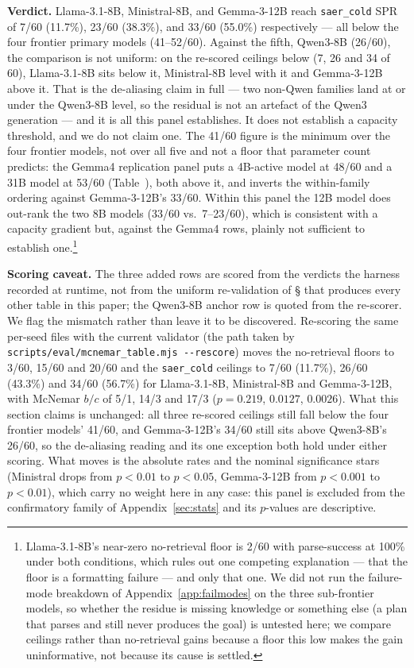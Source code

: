 \documentclass[letterpaper]{article} %
\newcommand{\appref}[1]{Appendix~\ref{#1}}
\newcommand{\bodyref}[1]{\getrefnumber{#1}}
\begin{document}
\textbf{Verdict.}  Llama-3.1-8B, Ministral-8B, and Gemma-3-12B reach
\texttt{saer\_cold} SPR of 7/60 (11.7\%), 23/60 (38.3\%), and 33/60
(55.0\%) respectively --- all below the four frontier primary models
(41--52/60).  Against the fifth, Qwen3-8B (26/60), the comparison is not
uniform: on the re-scored ceilings below (7, 26 and 34 of 60), Llama-3.1-8B
sits below it, Ministral-8B level with it and Gemma-3-12B above it.
That is the de-aliasing claim in full --- two non-Qwen families land at or
under the Qwen3-8B level, so the residual is not an artefact of the Qwen3
generation --- and it is all this panel establishes.  It does not establish a
capacity threshold, and we do not claim one.  The 41/60 figure is the minimum
over the four frontier models, not over all five and not a floor that
parameter count predicts: the Gemma4 replication panel puts a 4B-active model at 48/60
and a 31B model at 53/60 (Table~\bodyref{tab:main}), both above it, and
inverts the within-family ordering against Gemma-3-12B's 33/60.  Within
this panel the 12B model does out-rank the two 8B models
(33/60 vs.\ 7--23/60), which is consistent with a capacity gradient but,
against the Gemma4 rows, plainly not sufficient to establish
one.\footnote{Llama-3.1-8B's near-zero no-retrieval floor is 2/60 with
parse-success at 100\% under both conditions, which rules out one competing
explanation --- that the floor is a formatting failure --- and only that one.
We did not run the failure-mode breakdown of \appref{app:failmodes} on the
three sub-frontier models, so whether the residue is missing knowledge or
something else (a plan that parses and still never produces the goal) is
untested here; we compare ceilings rather than no-retrieval gains because a
floor this low makes the gain uninformative, not because its cause is
settled.}

\textbf{Scoring caveat.}  The three added rows are scored from the
verdicts the harness recorded at runtime, not from the uniform
re-validation of \S\bodyref{sec:protocol} that produces every other table in this paper;
the Qwen3-8B anchor row is quoted from the re-scorer.  We flag the
mismatch rather than leave it to be discovered.  Re-scoring the same
per-seed files with the current validator (the path taken by
\texttt{scripts/\allowbreak eval/\allowbreak mcnemar\_table.mjs -{}-rescore}) moves the
no-retrieval floors to 3/60, 15/60 and 20/60 and the
\texttt{saer\_cold} ceilings to 7/60 (11.7\%), 26/60 (43.3\%) and
34/60 (56.7\%) for Llama-3.1-8B, Ministral-8B and Gemma-3-12B, with
McNemar $b/c$ of 5/1, 14/3 and 17/3 ($p{=}0.219$, $0.0127$, $0.0026$).
What this section claims is unchanged: all three re-scored ceilings
still fall below the four frontier models' 41/60, and Gemma-3-12B's 34/60
still sits above Qwen3-8B's 26/60, so the de-aliasing reading and its one
exception both hold under either scoring.  What moves
is the absolute rates and the nominal significance stars (Ministral
drops from $p{<}0.01$ to $p{<}0.05$, Gemma-3-12B from $p{<}0.001$ to
$p{<}0.01$), which carry no weight here in any case: this panel is
excluded from the
confirmatory family of \appref{sec:stats} and its $p$-values are descriptive.
\end{document}
